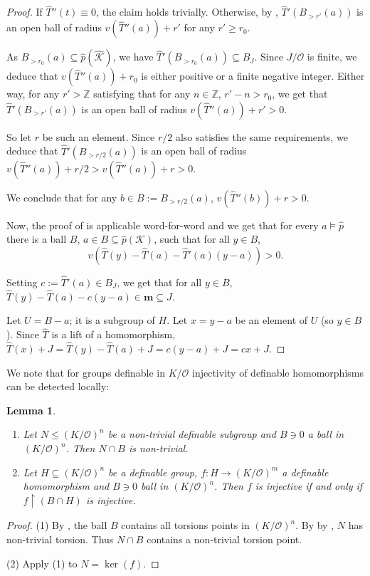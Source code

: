 \documentclass[11pt]{amsart}
\newtheorem{lemma}[theorem]{Lemma}
\theoremstyle{definition}
\newcommand{\m}{\textbf{m}}
\newcommand{\CK}{{\mathcal K}}
\newcommand{\CO}{{\mathcal O}}
\newcommand{\0}{\emptyset}
\newcommand{\rest}{\upharpoonright}
\def\sub{\subseteq}
\newenvironment{claimproof}[1][\proofname]
  {%
    \proof[#1]%
      \renewcommand*\qedsymbol{$\square$ (claim)}%
  }
  {%
    \endproof%
  }
\begin{document}
\begin{proof}
\begin{claimproof}
			
			If $\widehat T''(t)\equiv 0$, the claim holds trivially. Otherwise, by \cite[Fact 3.13]{HaHaPeGps}, $\widehat T'(B_{>r'}(a))$ is an open ball of radius $v(\widehat T''(a))+r'$ for any $r'\geq r_0$. 
			
			As $B_{>r_0}(a) \sub \widehat p(\widehat \CK)$, we have  $\widehat T'(B_{>r_0}(a))\sub B_J$. Since $J/\CO$ is finite, we deduce that  $v(\widehat T''(a))+r_0$ is either positive or a finite negative integer. Either way, for any $r'>\mathbb{Z}$ satisfying that for any $n\in \mathbb{Z}$, $r'-n>r_0$, we get that  $\widehat T'(B_{>r'}(a))$ is an open ball of radius $v(\widehat T''(a))+r'>0$.
			
			So let $r$ be such an element. Since $r/2$ also satisfies the same requirements, we deduce that $\widehat T'(B_{>r/2}(a))$ is an open ball of radius $v(\widehat T''(a))+r/2>v(\widehat T''(a))+r>0$.
			
			We conclude that for any $b\in B:= B_{>r/2}(a)$, $v(\widehat T''(b))+r>0$.
		\end{claimproof}
		
		Now, the proof of \cite[Lemma 3.18]{HaHaPeGps} is applicable word-for-word and we get that  for every $a\models \widehat p$ there is a  ball $B$, $a\in B\sub \widehat p(\CK)$, such that for all $y\in B$,
		\[
		v(\widehat T(y)-\widehat T(a)-\widehat T'(a)(y-a))>0.
		\]
		
		Setting $c:=\widehat T'(a)\in B_J$, we get that for all $y\in B$,  $\widehat T(y)-\widehat T(a)-c(y-a)\in \m \sub J$. 
		
		Let $U=B-a$; it is a subgroup of $H$. Let $x=y-a$ be an element of $U$ (so $y\in B$).  Since $\widehat T $ is a lift of a homomorphism, $\widehat T(x)+J=\widehat T(y)-\widehat T(a)+J=c(y-a)+J=cx+J$.
	\end{proof}

We note that for groups definable in $K/\CO$ injectivity of definable homomorphisms can be detected locally: 
	
	\begin{lemma}\label{L:subgroup intersects ball}\begin{enumerate}
			\item    Let $N\leq (K/\CO)^n$ be a non-trivial definable subgroup and $B\ni 0$ a ball in $(K/\CO)^n$. Then $N\cap B$ is non-trivial.
			\item Let $H\sub (K/\CO)^n$ be a definable group, $f:H\to (K/\CO)^m$
			a definable homomorphism and $B\ni 0$  ball in $(K/\CO)^n$. Then $f$ is injective if and only if $f\rest(B\cap H)$ is injective.
		\end{enumerate}
	\end{lemma}
	\begin{proof} 
		(1) By \cite[Lemmas 3.1(3), 3.10 (1)]{HaHaPeGps}, the ball $B$ contains all torsions points in $(K/\CO)^n$. 
		By  by \cite[Lemma 3.10 (2)]{HaHaPeGps}, 
		$N$ has non-trivial torsion. Thus $N\cap B$ contains a non-trivial torsion point.
		
		(2) Apply (1)  to $N=\ker(f)$.
	\end{proof}
	
\end{document}
